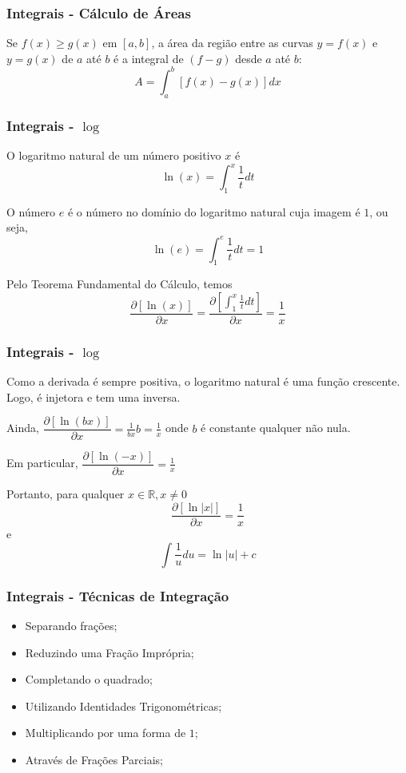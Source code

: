 \documentclass[hyperref={pdfpagelabels=false}]{beamer}
\begin{document}
\begin{frame}
\frametitle{Integrais - Cálculo de Áreas}

Se $f(x) \geq g(x)$ em $[a,b]$, a área da região entre as curvas $y = f(x)$ e $y = g(x)$ de $a$ até $b$ é a integral de $(f-g)$ desde $a$ até $b$:
$$A = \int_{a}^{b}[f(x)-g(x)]dx$$

\end{frame}

\begin{frame}
\frametitle{Integrais - $\log$}

O logaritmo natural de um número positivo $x$ é 
$$\ln(x) = \int_{1}^{x}\frac{1}{t}dt$$

O número $e$ é o número no domínio do logaritmo natural cuja imagem é $1$, ou seja,
$$\ln(e) = \int_{1}^{e}\frac{1}{t}dt = 1$$ \pause

Pelo Teorema Fundamental do Cálculo, temos $$\dfrac{\partial [\ln(x)]}{\partial x} = \dfrac{\partial\left[ \displaystyle \int_{1}^{x}\displaystyle \frac{1}{t}dt\right]}{\partial x} = \displaystyle \frac{1}{x}$$

\end{frame}


\begin{frame}
\frametitle{Integrais - $\log$}

Como a derivada é sempre positiva, o logaritmo natural é uma função crescente. Logo, é injetora e tem uma inversa. \pause

Ainda, $\dfrac{\partial [\ln(bx)]}{\partial x} = \frac{1}{bx}b = \frac{1}{x}$ onde $b$ é constante qualquer não nula. \pause

Em particular, $\dfrac{\partial [\ln(-x)]}{\partial x} = \frac{1}{x}$

Portanto, para qualquer $x \in \mathbb{R}, x \neq 0$
$$\dfrac{\partial [\ln|x|]}{\partial x} = \frac{1}{x}$$
e
$$\int\frac{1}{u}du = \ln|u| + c$$

\end{frame}


\begin{frame}
\frametitle{Integrais - Técnicas de Integração}

\begin{itemize}
 \item Separando frações; \pause
 \item Reduzindo uma Fração Imprópria; \pause
 \item Completando o quadrado; \pause
 \item Utilizando Identidades Trigonométricas; \pause
 \item Multiplicando por uma forma de $1$; \pause
 \item Através de Frações Parciais;
\end{itemize}


\end{frame}
\end{document}
